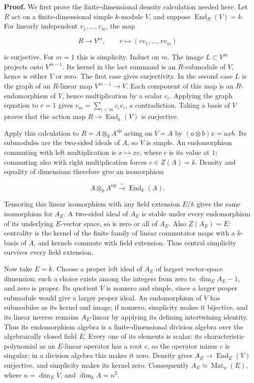 \documentclass[11pt,a4paper,openany]{report}
\begin{document}
\textbf{Proof.} We first prove the finite-dimensional density calculation needed here. Let \(R\) act on a finite-dimensional simple \(k\)-module \(V\), and suppose \(\operatorname{End}_R(V)=k\). For linearly independent \(v_1,\ldots,v_m\), the map

\[
R\longrightarrow V^m,\qquad r\longmapsto(rv_1,\ldots,rv_m)
\]

is surjective. For \(m=1\) this is simplicity. Induct on \(m\). The image \(L\subset V^m\) projects onto \(V^{m-1}\). Its kernel in the last summand is an \(R\)-submodule of \(V\), hence is either \(V\) or zero. The first case gives surjectivity. In the second case \(L\) is the graph of an \(R\)-linear map \(V^{m-1}\to V\). Each component of this map is an \(R\)-endomorphism of \(V\), hence multiplication by a scalar \(c_i\). Applying the graph equation to \(r=1\) gives \(v_m=\sum_{i<m}c_iv_i\), a contradiction. Taking a basis of \(V\) proves that the action map \(R\to\operatorname{End}_k(V)\) is surjective.

Apply this calculation to \(R=A\otimes_k A^{\mathrm{op}}\) acting on \(V=A\) by \((a\otimes b)x=axb\). Its submodules are the two-sided ideals of \(A\), so \(V\) is simple. An endomorphism commuting with left multiplication is \(x\mapsto xc\), where \(c\) is its value at \(1\); commuting also with right multiplication forces \(c\in Z(A)=k\). Density and equality of dimensions therefore give an isomorphism

\[
A\otimes_k A^{\mathrm{op}}\xrightarrow{\sim}\operatorname{End}_k(A).
\tag{6.2}
\]

Tensoring this linear isomorphism with any field extension \(E/k\) gives the same isomorphism for \(A_E\). A two-sided ideal of \(A_E\) is stable under every endomorphism of its underlying \(E\)-vector space, so is zero or all of \(A_E\). Also \(Z(A_E)=E\): centrality is the kernel of the finite family of linear commutator maps with a \(k\)-basis of \(A\), and kernels commute with field extension. Thus central simplicity survives every field extension.

Now take \(E=\overline{k}\). Choose a proper left ideal of \(A_E\) of largest vector-space dimension; such a choice exists among the integers from zero to \(\dim_E A_E-1\), and zero is proper. Its quotient \(V\) is nonzero and simple, since a larger proper submodule would give a larger proper ideal. An endomorphism of \(V\) has submodules as its kernel and image; if nonzero, simplicity makes it bijective, and its linear inverse remains \(A_E\)-linear by applying its defining intertwining identity. Thus its endomorphism algebra is a finite-dimensional division algebra over the algebraically closed field \(E\). Every one of its elements is scalar: its characteristic polynomial as an \(E\)-linear operator has a root \(c\), so the operator minus \(c\) is singular; in a division algebra this makes it zero. Density gives \(A_E\to\operatorname{End}_E(V)\) surjective, and simplicity makes its kernel zero. Consequently \(A_E\simeq\operatorname{Mat}_n(E)\), where \(n=\dim_E V\), and \(\dim_k A=n^2\).
\end{document}
